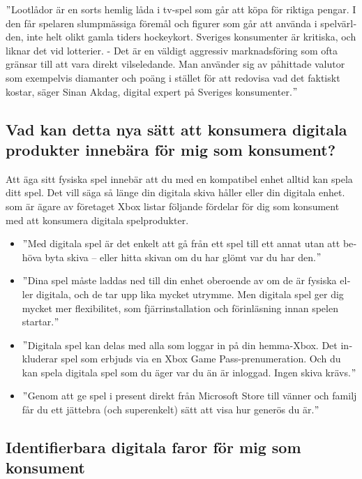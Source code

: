 \documentclass[11p]{article}
\begin{document}
\begin{otherlanguage}{swedish}
    \setlength{\leftskip}{1cm}

    \("\)Lootlådor är en sorts hemlig låda i tv-spel som går att köpa för riktiga pengar.
    I den får spelaren slumpmässiga föremål och figurer som går att använda i spelvärlden, inte helt olikt gamla tiders hockeykort.
    Sveriges konsumenter är kritiska, och liknar det vid lotterier.
    - Det är en väldigt aggressiv marknadsföring som ofta gränsar till att vara direkt vilseledande.
    Man använder sig av påhittade valutor som exempelvis diamanter och poäng i stället för att redovisa vad det faktiskt kostar, säger Sinan Akdag, digital expert på Sveriges konsumenter.\("\)\parencite{loot}

    \setlength{\leftskip}{0cm}



    \subsection{Vad kan detta nya sätt att konsumera digitala produkter innebära för mig som konsument?}
    Att äga sitt fysiska spel innebär att du med en kompatibel enhet alltid kan spela ditt spel.
    Det vill säga så länge din digitala skiva håller eller din digitala enhet.
    \textcite{support} som är ägare av företaget Xbox listar följande fördelar för dig som konsument med att konsumera digitala spelprodukter.
    \begin{itemize}
        \item \("\)Med digitala spel är det enkelt att gå från ett spel till ett annat utan att behöva byta skiva – eller hitta skivan om du har glömt var du har den.\("\)
        \item \("\)Dina spel måste laddas ned till din enhet oberoende av om de är fysiska eller digitala, och de tar upp lika mycket utrymme. Men digitala spel ger dig mycket mer flexibilitet, som fjärrinstallation och förinläsning innan spelen startar.\("\)
        \item \("\)Digitala spel kan delas med alla som loggar in på din hemma-Xbox. Det inkluderar spel som erbjuds via en Xbox Game Pass-prenumeration. Och du kan spela digitala spel som du äger var du än är inloggad. Ingen skiva krävs.\("\)
        \item \("\)Genom att ge spel i present direkt från Microsoft Store till vänner och familj får du ett jättebra (och superenkelt) sätt att visa hur generös du är.\("\)
    \end{itemize}


    \subsection{Identifierbara digitala faror för mig som konsument}


\end{otherlanguage}
\end{document}
